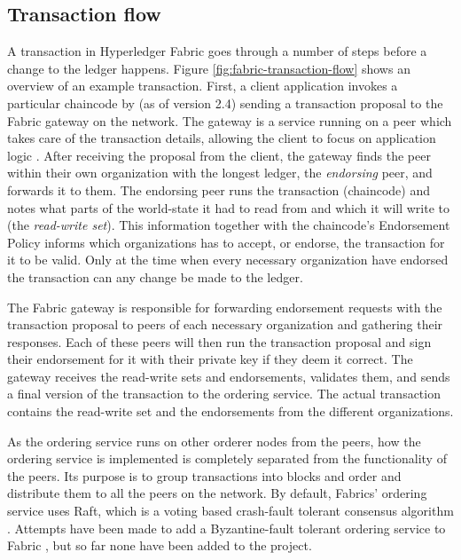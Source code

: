\documentclass[english, biblatex, digitaloutput]{kththesis}
\begin{document}

\subsection{Transaction flow}
\label{subsec:transaction-flow}

A transaction in Hyperledger Fabric goes through a number of steps before a change to the ledger happens. Figure \ref{fig:fabric-transaction-flow} shows an overview of an example transaction. First, a client application invokes a particular chaincode by (as of version 2.4) sending a transaction proposal to the Fabric gateway on the network. The gateway is a service running on a peer which takes care of the transaction details, allowing the client to focus on application logic \cite{fabric_gateway_2022}. After receiving the proposal from the client, the gateway finds the peer within their own organization with the longest ledger, the \textit{endorsing} peer, and forwards it to them. The endorsing peer runs the transaction (\ie chaincode) and notes what parts of the world-state it had to read from and which it will write to (the \textit{read-write set}). This information together with the chaincode's Endorsement Policy informs which organizations has to accept, or endorse, the transaction for it to be valid. Only at the time when every necessary organization have endorsed the transaction can any change be made to the ledger.

The Fabric gateway is responsible for forwarding endorsement requests with the transaction proposal to peers of each necessary organization and gathering their responses. Each of these peers will then run the transaction proposal and sign their endorsement for it with their private key if they deem it correct. The gateway receives the read-write sets and endorsements, validates them, and sends a final version of the transaction to the ordering service. The actual transaction contains the read-write set and the endorsements from the different organizations.

As the ordering service runs on other orderer nodes from the peers, how the ordering service is implemented is completely separated from the functionality of the peers. Its purpose is to group transactions into blocks and order and distribute them to all the peers on the network. By default, Fabrics' ordering service uses Raft, which is a voting based crash-fault tolerant consensus algorithm \cite{ongaro_raft_2014}. Attempts have been made to add a Byzantine-fault tolerant ordering service to Fabric \cite{barger_byzantine_2021}, but so far none have been added to the project.
\end{document}
